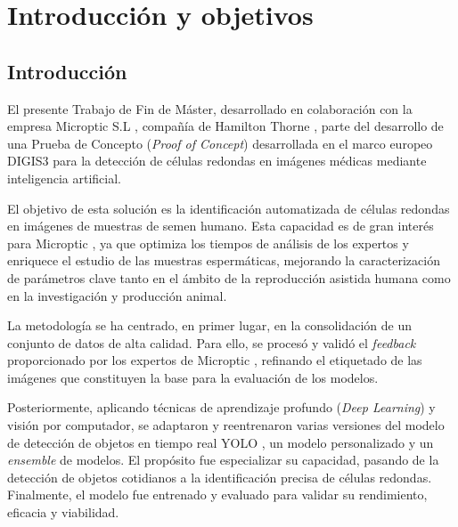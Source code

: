 \documentclass[12pt,a4paper,onecolumn,oneside]{report}
\begin{document}
\newpage
\renewcommand{\thepage}{\arabic{page}}
\setcounter{page}{1} %

\chapter{Introducción y objetivos} %
\label{Introducción y objetivos}
\section{Introducción}
\label{sec:Introducción}

El presente Trabajo de Fin de Máster, desarrollado en colaboración con la empresa Microptic S.L \cite{microptic}, compañía de Hamilton Thorne \cite{HamiltonThorneWeb}, 
parte del desarrollo de una Prueba de Concepto (\textit{Proof of Concept}) desarrollada en el marco europeo DIGIS3 \cite{digis3} para la detección de células redondas en imágenes médicas 
mediante inteligencia artificial.

El objetivo de esta solución es la identificación automatizada de células redondas en imágenes de muestras de semen humano. Esta capacidad es de 
gran interés para Microptic \cite{microptic}, ya que optimiza los tiempos de análisis de los expertos y enriquece el estudio de las muestras espermáticas, 
mejorando la caracterización de parámetros clave tanto en el ámbito de la reproducción asistida humana como en la investigación y producción animal. 

La metodología se ha centrado, en primer lugar, en la consolidación de un conjunto de datos de alta calidad. Para ello, se procesó y validó el \textit{feedback} 
proporcionado por los expertos de Microptic \cite{microptic}, refinando el etiquetado de las imágenes que constituyen la base para la evaluación de los modelos.

Posteriormente, aplicando técnicas de aprendizaje profundo (\textit{Deep Learning}) y visión por computador, se adaptaron y reentrenaron varias versiones 
del modelo de detección de objetos en tiempo real YOLO \cite{ultralytics_models}, un modelo personalizado y un \textit{ensemble} de modelos. El propósito fue especializar su capacidad, pasando de la detección de objetos 
cotidianos a la identificación precisa de células redondas. Finalmente, el modelo fue entrenado y evaluado para validar su rendimiento, eficacia y viabilidad.
\end{document}
